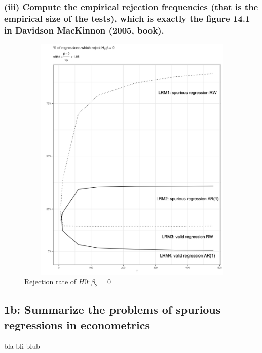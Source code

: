 \documentclass[]{article}
\begin{document}
\newpage
\subsubsection*{(iii) Compute the empirical rejection frequencies (that is the empirical size of the tests), which is exactly the figure 14.1 in Davidson MacKinnon (2005, book).}

\begin{figure}[H]
	\centering
	\includegraphics[width=14cm, height=12cm]{"./1aiii_chart"}
	\caption[]{Rejection rate of $H0: \beta_2=0$}
\end{figure}

\subsection*{1b: Summarize the problems of spurious regressions in econometrics}

\begin{multicols}{2}
	bla bli blub
	
	\blindtext 
	\columnbreak

\end{multicols}
\end{document}
